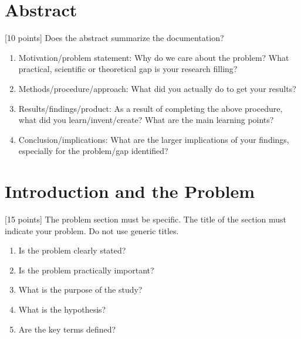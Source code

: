 \documentclass[letterpaper,10pt,english]{sphinxmanual}
\begin{document}
\section{Abstract}
\label{\detokenize{docs/rubric:abstract}}
\sphinxAtStartPar
{[}10 points{]} Does the abstract summarize the documentation?
\begin{enumerate}
%
\item {} 
\sphinxAtStartPar
Motivation/problem statement: Why do we care about the problem? What practical, scientific or theoretical gap is your research filling?

\item {} 
\sphinxAtStartPar
Methods/procedure/approach: What did you actually do to get your results?

\item {} 
\sphinxAtStartPar
Results/findings/product: As a result of completing the above procedure, what did you learn/invent/create? What are the main learning points?

\item {} 
\sphinxAtStartPar
Conclusion/implications: What are the larger implications  of your findings, especially for the problem/gap identified?

\end{enumerate}


\section{Introduction and the Problem}
\label{\detokenize{docs/rubric:introduction-and-the-problem}}
\sphinxAtStartPar
{[}15 points{]} The problem section must be specific. The title of the section must indicate your problem. Do not use generic titles.
\begin{enumerate}
%
\item {} 
\sphinxAtStartPar
Is the problem clearly stated?

\item {} 
\sphinxAtStartPar
Is the problem practically important?

\item {} 
\sphinxAtStartPar
What is the purpose of the study?

\item {} 
\sphinxAtStartPar
What is the hypothesis?

\item {} 
\sphinxAtStartPar
Are the key terms defined?

\end{enumerate}
\end{document}
